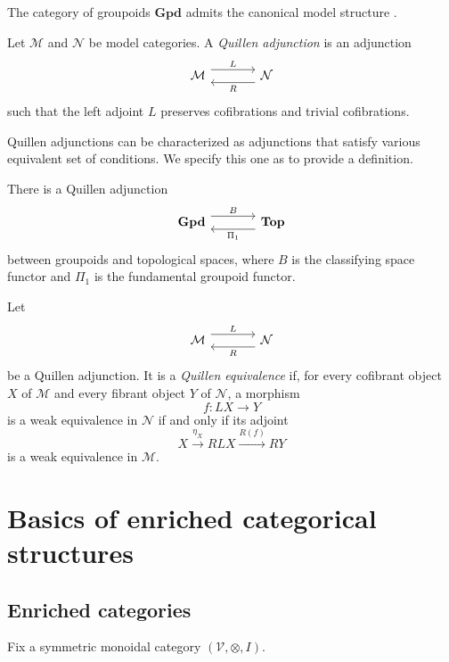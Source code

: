 \documentclass{tac}
\begin{document}
\begin{example}
The category of groupoids $\mathbf{Gpd}$ admits the canonical model structure
\cite{And1}.
\end{example}

\begin{definition}
Let $\mathcal{M}$ and $\mathcal{N}$ be model categories. A
\emph{Quillen adjunction} is an adjunction
\[
\begin{tikzcd}[column sep=large]
\mathcal{M}
\arrow[r, shift left=1.2ex, "L"]
&
\mathcal{N}
\arrow[l, shift left=1.2ex, "R"]
\end{tikzcd}
\]
such that the left adjoint $L$ preserves cofibrations and trivial
cofibrations.
\end{definition}

Quillen adjunctions can be characterized as adjunctions that satisfy various equivalent set of conditions. We specify this one as to provide a definition.

\begin{example}
There is a Quillen adjunction
\[
\begin{tikzcd}[column sep=large]
\mathbf{Gpd}
\arrow[r, shift left=1.2ex, "B"]
&
\mathbf{Top}
\arrow[l, shift left=1.2ex, "\Pi_1"]
\end{tikzcd}
\]
between groupoids and topological spaces, where $B$ is the classifying space
functor and $\Pi_1$ is the fundamental groupoid functor.
\end{example}

\begin{definition}
Let
\[
\begin{tikzcd}[column sep=large]
\mathcal{M}
\arrow[r, shift left=1.2ex, "L"]
&
\mathcal{N}
\arrow[l, shift left=1.2ex, "R"]
\end{tikzcd}
\]
be a Quillen adjunction. It is a \emph{Quillen equivalence} if, for every
cofibrant object $X$ of $\mathcal{M}$ and every fibrant object $Y$ of
$\mathcal{N}$, a morphism
\[
f:LX\longrightarrow Y
\]
is a weak equivalence in $\mathcal{N}$ if and only if its adjoint
\[
X\xrightarrow{\eta_X}RLX\xrightarrow{R(f)}RY
\]
is a weak equivalence in $\mathcal{M}$.
\end{definition}



 \section{Basics of enriched categorical structures}

 \subsection*{Enriched categories}
Fix a symmetric monoidal category $(\mathcal{V},\otimes,I)$.
\end{document}

